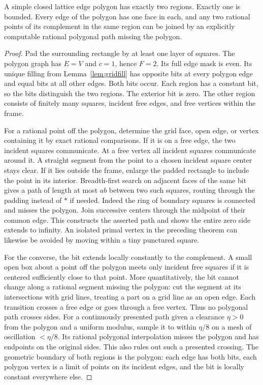 \begin{theorem}\label{thm:gridJordan}\label{idx-plane33}
A simple closed lattice edge polygon has exactly two regions. Exactly one is bounded. Every edge of the polygon has one face in each, and any two rational points of its complement in the same region can be joined by an explicitly computable rational polygonal path missing the polygon.
\end{theorem}
\begin{proof}
Pad the surrounding rectangle by at least one layer of squares. The polygon graph has $E=V$ and $c=1$, hence $F=2$. Its full edge mask is even. Its unique filling from Lemma~\ref{lem:gridfill} has opposite bits at every polygon edge and equal bits at all other edges. Both bits occur. Each region has a constant bit, so the bits distinguish the two regions. The exterior bit is zero. The other region consists of finitely many squares, incident free edges, and free vertices within the frame.

For a rational point off the polygon, determine the grid face, open edge, or vertex containing it by exact rational comparisons. If it is on a free edge, the two incident squares communicate. At a free vertex all incident squares communicate around it. A straight segment from the point to a chosen incident square center stays clear. If it lies outside the frame, enlarge the padded rectangle to include the point in its interior. Breadth-first search on adjacent faces of the same bit gives a path of length at most $ab$ between two such squares, routing through the padding instead of $*$ if needed. Indeed the ring of boundary squares is connected and misses the polygon. Join successive centers through the midpoint of their common edge. This constructs the asserted path and shows the entire zero side extends to infinity. An isolated primal vertex in the preceding theorem can likewise be avoided by moving within a tiny punctured square.

For the converse, the bit extends locally constantly to the complement. A small open box about a point off the polygon meets only incident free squares if it is centered sufficiently close to that point. More quantitatively, the bit cannot change along a rational segment missing the polygon: cut the segment at its intersections with grid lines, treating a part on a grid line as an open edge. Each transition crosses a free edge or goes through a free vertex. Thus no polygonal path crosses sides. For a continuously presented path given a clearance $\eta>0$ from the polygon and a uniform modulus, sample it to within $\eta/8$ on a mesh of oscillation $<\eta/8$. Its rational polygonal interpolation misses the polygon and has endpoints on the original sides. This also rules out such a presented crossing. The geometric boundary of both regions is the polygon: each edge has both bits, each polygon vertex is a limit of points on its incident edges, and the bit is locally constant everywhere else.
\end{proof}


